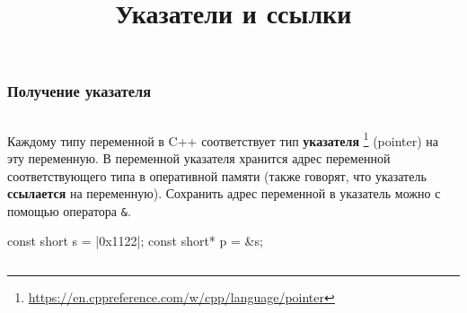 \documentclass[compress, 8pt, aspectratio=169]{beamer}
\title{Указатели и ссылки}
\begin{document}
\frame[plain]{\titlepage}

\begin{frame}[fragile]

    \frametitle{Получение указателя}

    \begin{columns}[T]

        \begin{column}{0.5\textwidth}

            Каждому типу переменной в C++ соответствует тип \textbf{указателя}
            \footnote{\url{https://en.cppreference.com/w/cpp/language/pointer}}
            (pointer) на эту переменную.
            В переменной указателя хранится адрес переменной соответствующего
            типа в оперативной памяти (также говорят, что указатель
            \textbf{ссылается} на переменную).
            Сохранить адрес переменной в указатель можно с помощью оператора \verb|&|.

            \begin{myinplacelisting}[minted language=cpp]
const short s = |\colorbox{green!20}{0x1122}|;
const short* p = &s;
            \end{myinplacelisting}

        \end{column}

        \begin{column}{0.5\textwidth}

            \centering

            \begin{tikzpicture} [
                bytenode/.style={
                    rectangle,
                    thick,
                    minimum width=9mm,
                    minimum height=4mm
                }
            ]


\end{tikzpicture}
\end{column}
\end{columns}
\end{frame}
\end{document}
